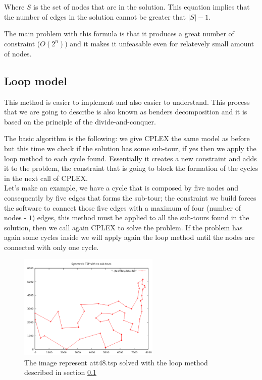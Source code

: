 Where $S$ is the set of nodes that are in the solution. This equation implies that the number of edges in the solution cannot be greater that $|S|-1$.

The main problem with this formula is that it produces a great number of constraint ($O(2^n)$) and it makes it unfeasable even for relatevely small amount of nodes.

\subsection{Loop model}
\label{sec:loop}
This method is easier to implement and also easier to understand. This process that we are going to describe is also known as benders decomposition and it is based on the principle of the divide-and-conquer.

The basic algorithm is the following: we give CPLEX the same model as before but this time we check if the solution has some sub-tour, if yes then we apply the loop method to each cycle found. Essentially it creates a new constraint and adds it to the problem, the constraint that is going to block the formation of the cycles in the next call of CPLEX. \\
Let's make an example, we have a cycle that is composed by five nodes and consequently by five edges that forms the sub-tour; the constraint we build forces the software to connect those five edges with a maximum of four (number of nodes - $1$) edges, this method must be applied to all the sub-tours found in the solution, then we call again CPLEX to solve the problem. If the problem has again some cycles inside we will apply again the loop method until the nodes are connected with only one cycle.

\begin{figure}[h]
	\centering
	\includegraphics[width=0.6\textwidth]{images/symmetric_with_no_tours}
	\caption{The image represent att48.tsp solved with the loop method described in section \ref{sec:loop}}
\end{figure}

